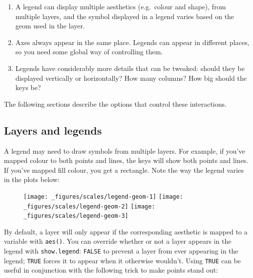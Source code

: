 \begin{enumerate}
\def\labelenumi{\arabic{enumi}.}
\item
  A legend can display multiple aesthetics (e.g.~colour and shape), from
  multiple layers, and the symbol displayed in a legend varies based on
  the geom used in the layer.
\item
  Axes always appear in the same place. Legends can appear in different
  places, so you need some global way of controlling them.
\item
  Legends have considerably more details that can be tweaked: should
  they be displayed vertically or horizontally? How many columns? How
  big should the keys be?
\end{enumerate}

The following sections describe the options that control these
interactions.

\hypertarget{sub-layers-legends}{\subsection{Layers and
legends}\label{sub-layers-legends}}

A legend may need to draw symbols from multiple layers. For example, if
you've mapped colour to both points and lines, the keys will show both
points and lines. If you've mapped fill colour, you get a rectangle.
Note the way the legend varies in the plots below:

\begin{figure}[H]
  \texttt{[image: \_figures/scales/legend-geom-1]}%
  \texttt{[image: \_figures/scales/legend-geom-2]}%
  \texttt{[image: \_figures/scales/legend-geom-3]}
\end{figure}

By default, a layer will only appear if the corresponding aesthetic is
mapped to a variable with \texttt{aes()}. You can override whether or
not a layer appears in the legend with \texttt{show.legend}:
\texttt{FALSE} to prevent a layer from ever appearing in the legend;
\texttt{TRUE} forces it to appear when it otherwise wouldn't. Using
\texttt{TRUE} can be useful in conjunction with the following trick to
make points stand out:

